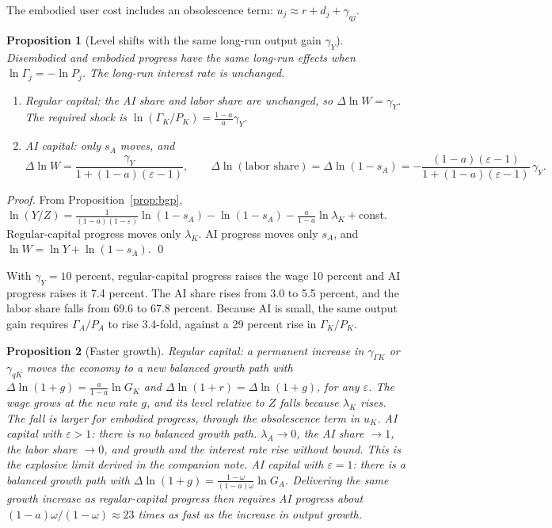 \documentclass[11pt]{article}
\newtheorem{proposition}{Proposition}
\newcommand{\e}{\varepsilon}
\begin{document}
The embodied user cost includes an obsolescence term: $u_j\approx r+d_j+\gamma_{qj}$.

\begin{proposition}[Level shifts with the same long-run output gain $\gamma_Y$]\label{prop:level}
Disembodied and embodied progress have the same long-run effects when
$\ln\Gamma_j=-\ln P_j$. The long-run interest rate is unchanged.
\begin{enumerate}
\item \emph{Regular capital}: the AI share and labor share are unchanged, so
$\Delta\ln W=\gamma_Y$. The required shock is $\ln(\Gamma_K/P_K)=\frac{1-a}{a}\gamma_Y$.
\item \emph{AI capital}: only $s_A$ moves, and
\begin{equation*}
\Delta\ln W=\frac{\gamma_Y}{1+(1-a)(\e-1)},\qquad
\Delta\ln(\text{labor share})=\Delta\ln(1-s_A)=-\frac{(1-a)(\e-1)}{1+(1-a)(\e-1)}\,\gamma_Y .
\end{equation*}
\end{enumerate}
\end{proposition}
\emph{Proof.} From Proposition~\ref{prop:bgp}, $\ln(Y/Z)=\frac{1}{(1-a)(1-\e)}\ln(1-s_A)-\ln(1-s_A)-\frac{a}{1-a}\ln\lambda_K+$const.
Regular-capital progress moves only $\lambda_K$. AI progress moves only $s_A$, and
$\ln W=\ln Y+\ln(1-s_A)$. \qed

With $\gamma_Y=10$ percent, regular-capital progress raises the wage 10 percent and AI
progress raises it 7.4 percent. The AI share rises from 3.0 to 5.5 percent, and the labor
share falls from 69.6 to 67.8 percent. Because AI is small, the same output gain requires
$\Gamma_A/P_A$ to rise 3.4-fold, against a 29 percent rise in $\Gamma_K/P_K$.

\begin{proposition}[Faster growth]\label{prop:growth}
\emph{Regular capital}: a permanent increase in $\gamma_{\Gamma K}$ or $\gamma_{qK}$ moves the
economy to a new balanced growth path with $\Delta\ln(1+g)=\frac{a}{1-a}\ln G_K$ and
$\Delta\ln(1+r)=\Delta\ln(1+g)$, for any $\e$. The wage grows at the new rate $g$, and its
level relative to $Z$ falls because $\lambda_K$ rises. The fall is larger for embodied
progress, through the obsolescence term in $u_K$.
\emph{AI capital with $\e>1$}: there is no balanced growth path. $\lambda_A\to0$, the AI
share $\to1$, the labor share $\to0$, and growth and the interest rate rise without
bound. This is the explosive limit derived in the companion note.
\emph{AI capital with $\e=1$}: there is a balanced growth path with
$\Delta\ln(1+g)=\frac{1-\omega}{(1-a)\omega}\ln G_A$. Delivering the same growth increase as
regular-capital progress then requires AI progress about $(1-a)\omega/(1-\omega)\approx23$
times as fast as the increase in output growth.
\end{proposition}
\end{document}
